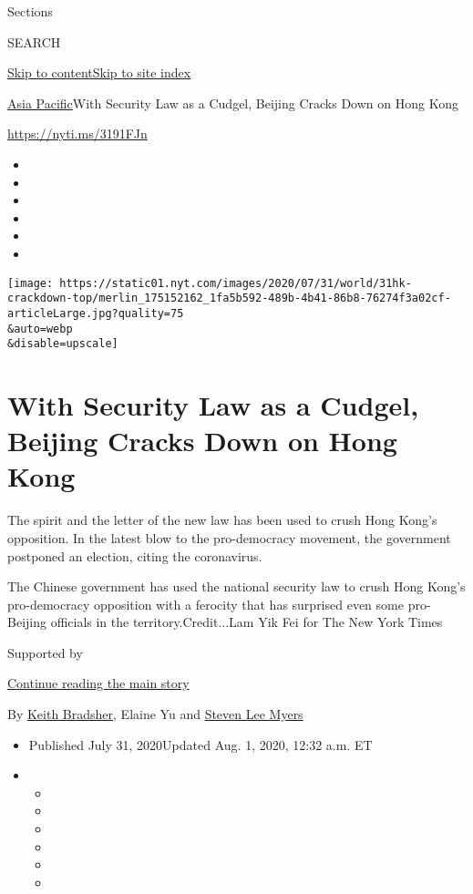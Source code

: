 Sections

SEARCH

\protect\hyperlink{site-content}{Skip to
content}\protect\hyperlink{site-index}{Skip to site index}

\href{/section/world/asia}{Asia Pacific}\textbar{}With Security Law as a
Cudgel, Beijing Cracks Down on Hong Kong

\url{https://nyti.ms/3191FJn}

\begin{itemize}
\item
\item
\item
\item
\item
\item
\end{itemize}

\texttt{[image: https://static01.nyt.com/images/2020/07/31/world/31hk-crackdown-top/merlin\_175152162\_1fa5b592-489b-4b41-86b8-76274f3a02cf-articleLarge.jpg?quality=75\\\&auto=webp\\\&disable=upscale]}

\hypertarget{with-security-law-as-a-cudgel-beijing-cracks-down-on-hong-kong}{%
\section{With Security Law as a Cudgel, Beijing Cracks Down on Hong
Kong}\label{with-security-law-as-a-cudgel-beijing-cracks-down-on-hong-kong}}

The spirit and the letter of the new law has been used to crush Hong
Kong's opposition. In the latest blow to the pro-democracy movement, the
government postponed an election, citing the coronavirus.

The Chinese government has used the national security law to crush Hong
Kong's pro-democracy opposition with a ferocity that has surprised even
some pro-Beijing officials in the territory.Credit...Lam Yik Fei for The
New York Times

Supported by

\protect\hyperlink{after-sponsor}{Continue reading the main story}

By \href{https://www.nytimes.com/by/keith-bradsher}{Keith Bradsher},
Elaine Yu and \href{https://www.nytimes.com/by/steven-lee-myers}{Steven
Lee Myers}

\begin{itemize}
\item
  Published July 31, 2020Updated Aug. 1, 2020, 12:32 a.m. ET
\item
  \begin{itemize}
  \item
  \item
  \item
  \item
  \item
  \item
  \end{itemize}
\end{itemize}

